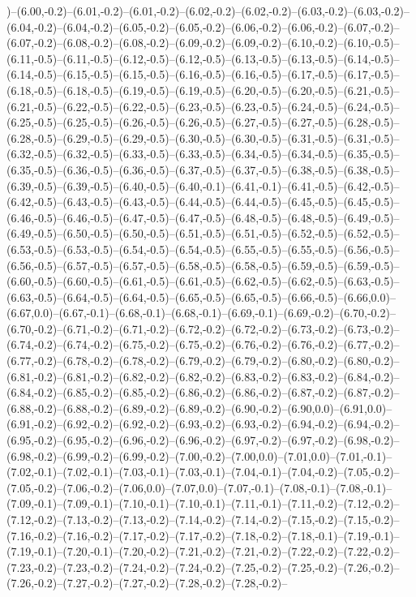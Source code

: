 )--(6.00,-0.2)--(6.01,-0.2)--(6.01,-0.2)--(6.02,-0.2)--(6.02,-0.2)--(6.03,-0.2)--(6.03,-0.2)--(6.04,-0.2)--(6.04,-0.2)--(6.05,-0.2)--(6.05,-0.2)--(6.06,-0.2)--(6.06,-0.2)--(6.07,-0.2)--(6.07,-0.2)--(6.08,-0.2)--(6.08,-0.2)--(6.09,-0.2)--(6.09,-0.2)--(6.10,-0.2)--(6.10,-0.5)--(6.11,-0.5)--(6.11,-0.5)--(6.12,-0.5)--(6.12,-0.5)--(6.13,-0.5)--(6.13,-0.5)--(6.14,-0.5)--(6.14,-0.5)--(6.15,-0.5)--(6.15,-0.5)--(6.16,-0.5)--(6.16,-0.5)--(6.17,-0.5)--(6.17,-0.5)--(6.18,-0.5)--(6.18,-0.5)--(6.19,-0.5)--(6.19,-0.5)--(6.20,-0.5)--(6.20,-0.5)--(6.21,-0.5)--(6.21,-0.5)--(6.22,-0.5)--(6.22,-0.5)--(6.23,-0.5)--(6.23,-0.5)--(6.24,-0.5)--(6.24,-0.5)--(6.25,-0.5)--(6.25,-0.5)--(6.26,-0.5)--(6.26,-0.5)--(6.27,-0.5)--(6.27,-0.5)--(6.28,-0.5)--(6.28,-0.5)--(6.29,-0.5)--(6.29,-0.5)--(6.30,-0.5)--(6.30,-0.5)--(6.31,-0.5)--(6.31,-0.5)--(6.32,-0.5)--(6.32,-0.5)--(6.33,-0.5)--(6.33,-0.5)--(6.34,-0.5)--(6.34,-0.5)--(6.35,-0.5)--(6.35,-0.5)--(6.36,-0.5)--(6.36,-0.5)--(6.37,-0.5)--(6.37,-0.5)--(6.38,-0.5)--(6.38,-0.5)--(6.39,-0.5)--(6.39,-0.5)--(6.40,-0.5)--(6.40,-0.1)--(6.41,-0.1)--(6.41,-0.5)--(6.42,-0.5)--(6.42,-0.5)--(6.43,-0.5)--(6.43,-0.5)--(6.44,-0.5)--(6.44,-0.5)--(6.45,-0.5)--(6.45,-0.5)--(6.46,-0.5)--(6.46,-0.5)--(6.47,-0.5)--(6.47,-0.5)--(6.48,-0.5)--(6.48,-0.5)--(6.49,-0.5)--(6.49,-0.5)--(6.50,-0.5)--(6.50,-0.5)--(6.51,-0.5)--(6.51,-0.5)--(6.52,-0.5)--(6.52,-0.5)--(6.53,-0.5)--(6.53,-0.5)--(6.54,-0.5)--(6.54,-0.5)--(6.55,-0.5)--(6.55,-0.5)--(6.56,-0.5)--(6.56,-0.5)--(6.57,-0.5)--(6.57,-0.5)--(6.58,-0.5)--(6.58,-0.5)--(6.59,-0.5)--(6.59,-0.5)--(6.60,-0.5)--(6.60,-0.5)--(6.61,-0.5)--(6.61,-0.5)--(6.62,-0.5)--(6.62,-0.5)--(6.63,-0.5)--(6.63,-0.5)--(6.64,-0.5)--(6.64,-0.5)--(6.65,-0.5)--(6.65,-0.5)--(6.66,-0.5)--(6.66,0.0)--(6.67,0.0)--(6.67,-0.1)--(6.68,-0.1)--(6.68,-0.1)--(6.69,-0.1)--(6.69,-0.2)--(6.70,-0.2)--(6.70,-0.2)--(6.71,-0.2)--(6.71,-0.2)--(6.72,-0.2)--(6.72,-0.2)--(6.73,-0.2)--(6.73,-0.2)--(6.74,-0.2)--(6.74,-0.2)--(6.75,-0.2)--(6.75,-0.2)--(6.76,-0.2)--(6.76,-0.2)--(6.77,-0.2)--(6.77,-0.2)--(6.78,-0.2)--(6.78,-0.2)--(6.79,-0.2)--(6.79,-0.2)--(6.80,-0.2)--(6.80,-0.2)--(6.81,-0.2)--(6.81,-0.2)--(6.82,-0.2)--(6.82,-0.2)--(6.83,-0.2)--(6.83,-0.2)--(6.84,-0.2)--(6.84,-0.2)--(6.85,-0.2)--(6.85,-0.2)--(6.86,-0.2)--(6.86,-0.2)--(6.87,-0.2)--(6.87,-0.2)--(6.88,-0.2)--(6.88,-0.2)--(6.89,-0.2)--(6.89,-0.2)--(6.90,-0.2)--(6.90,0.0)--(6.91,0.0)--(6.91,-0.2)--(6.92,-0.2)--(6.92,-0.2)--(6.93,-0.2)--(6.93,-0.2)--(6.94,-0.2)--(6.94,-0.2)--(6.95,-0.2)--(6.95,-0.2)--(6.96,-0.2)--(6.96,-0.2)--(6.97,-0.2)--(6.97,-0.2)--(6.98,-0.2)--(6.98,-0.2)--(6.99,-0.2)--(6.99,-0.2)--(7.00,-0.2)--(7.00,0.0)--(7.01,0.0)--(7.01,-0.1)--(7.02,-0.1)--(7.02,-0.1)--(7.03,-0.1)--(7.03,-0.1)--(7.04,-0.1)--(7.04,-0.2)--(7.05,-0.2)--(7.05,-0.2)--(7.06,-0.2)--(7.06,0.0)--(7.07,0.0)--(7.07,-0.1)--(7.08,-0.1)--(7.08,-0.1)--(7.09,-0.1)--(7.09,-0.1)--(7.10,-0.1)--(7.10,-0.1)--(7.11,-0.1)--(7.11,-0.2)--(7.12,-0.2)--(7.12,-0.2)--(7.13,-0.2)--(7.13,-0.2)--(7.14,-0.2)--(7.14,-0.2)--(7.15,-0.2)--(7.15,-0.2)--(7.16,-0.2)--(7.16,-0.2)--(7.17,-0.2)--(7.17,-0.2)--(7.18,-0.2)--(7.18,-0.1)--(7.19,-0.1)--(7.19,-0.1)--(7.20,-0.1)--(7.20,-0.2)--(7.21,-0.2)--(7.21,-0.2)--(7.22,-0.2)--(7.22,-0.2)--(7.23,-0.2)--(7.23,-0.2)--(7.24,-0.2)--(7.24,-0.2)--(7.25,-0.2)--(7.25,-0.2)--(7.26,-0.2)--(7.26,-0.2)--(7.27,-0.2)--(7.27,-0.2)--(7.28,-0.2)--(7.28,-0.2)--